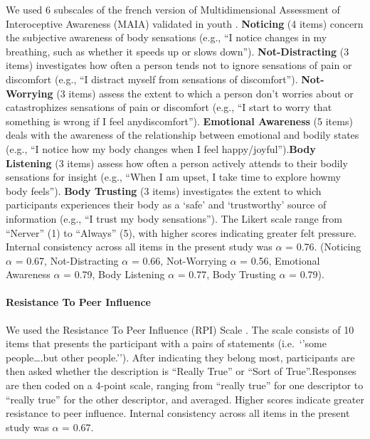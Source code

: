\documentclass[preprint, 3p,
authoryear]{elsarticle} %
\begin{document}
We used 6 subscales of the french version of Multidimensional Assessment
of Interoceptive Awareness (MAIA) \citep{mehling_multidimensional_2012}
validated in youth \citep{jones_exploring_2021}. \textbf{Noticing} (4
items) concern the subjective awareness of body sensations (e.g., ``I
notice changes in my breathing, such as whether it speeds up or slows
down''). \textbf{Not-Distracting} (3 items) investigates how often a
person tends not to ignore sensations of pain or discomfort (e.g., ``I
distract myself from sensations of discomfort''). \textbf{Not-Worrying}
(3 items) assess the extent to which a person don't worries about or
catastrophizes sensations of pain or discomfort (e.g., ``I start to
worry that something is wrong if I feel anydiscomfort'').
\textbf{Emotional Awareness} (5 items) deals with the awareness of the
relationship between emotional and bodily states (e.g., ``I notice how
my body changes when I feel happy/joyful'').\textbf{Body Listening} (3
items) assess how often a person actively attends to their bodily
sensations for insight (e.g., ``When I am upset, I take time to explore
howmy body feels''). \textbf{Body Trusting} (3 items) investigates the
extent to which participants experiences their body as a `safe' and
`trustworthy' source of information (e.g., ``I trust my body
sensations''). The Likert scale range from ``Nerver'' (1) to ``Always''
(5), with higher scores indicating greater felt pressure. Internal
consistency across all items in the present study was \(\alpha\) = 0.76.
(Noticing \(\alpha\) = 0.67, Not-Distracting \(\alpha\) = 0.66,
Not-Worrying \(\alpha\) = 0.56, Emotional Awareness \(\alpha\) = 0.79,
Body Listening \(\alpha\) = 0.77, Body Trusting \(\alpha\) = 0.79).

\hypertarget{resistance-to-peer-influence}{%
\paragraph{Resistance To Peer
Influence}\label{resistance-to-peer-influence}}

We used the Resistance To Peer Influence (RPI) Scale
\citep{steinberg_age_2007}. The scale consists of 10 items that presents
the participant with a pairs of statements (i.e.~`'some people\ldots.but
other people.''). After indicating they belong most, participants are
then asked whether the description is ``Really True'' or ``Sort of
True''.Responses are then coded on a 4-point scale, ranging from
``really true'' for one descriptor to ``really true'' for the other
descriptor, and averaged. Higher scores indicate greater resistance to
peer influence. Internal consistency across all items in the present
study was \(\alpha\) = 0.67.
\end{document}

